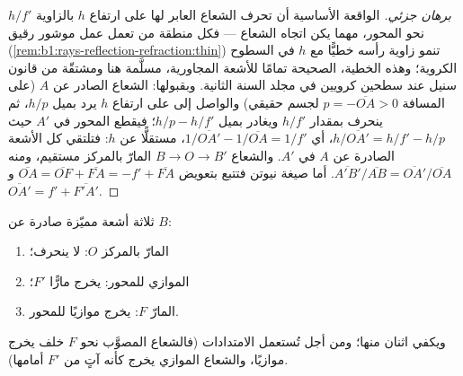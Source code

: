 \begin{proof}[برهان جزئي]
الواقعة الأساسية أن  تحرف الشعاع العابر لها على ارتفاع
$h$ بالزاوية $h/f'$ نحو المحور، مهما يكن اتجاه الشعاع
--- فكل منطقة من  تعمل عمل موشور رقيق (\cref{rem:b1:rays-reflection-refraction:thin})
تنمو زاوية رأسه خطيًّا مع $h$ في السطوح الكروية؛ وهذه
الخطية، الصحيحة تمامًا للأشعة المجاورية، مسلَّمة هنا ومشتقّة من قانون
سنيل عند سطحين كرويين في مجلد السنة الثانية. وبقبولها:
الشعاع الصادر عن $A$ (على المسافة $p = -\overline{OA} > 0$ لجسم
حقيقي) والواصل إلى  على ارتفاع $h$ يرد بميل $h/p$، ثم
ينحرف بمقدار $h/f'$ ويغادر بميل $h/p - h/f'$؛ فيقطع المحور
في $A'$ حيث $h/\overline{OA'} = h/f' - h/p$، أي $1/\overline{OA'}
- 1/\overline{OA} = 1/f'$، مستقلًّا عن $h$: فتلتقي كل الأشعة الصادرة عن $A$
في $A'$. والشعاع $B \to O \to B'$ المارّ بالمركز مستقيم، ومنه
$\overline{A'B'}/\overline{AB} = \overline{OA'}/\overline{OA}$. أما
صيغة نيوتن فتتبع بتعويض $\overline{OA} = \overline{OF} + \overline{FA}
= -f' + \overline{FA}$ و $\overline{OA'} = f' + \overline{F'A'}$.
\end{proof}

\begin{method}\label{met:b1:mirrors-thin-lenses:lensrays}
ثلاثة أشعة مميّزة صادرة عن $B$:
\begin{enumerate}
  \item المارّ بالمركز $O$: لا ينحرف؛
  \item الموازي للمحور: يخرج مارًّا  $F'$؛
  \item المارّ  $F$: يخرج موازيًا للمحور.
\end{enumerate}
ويكفي اثنان منها؛ ومن أجل  تُستعمل الامتدادات (فالشعاع
المصوَّب نحو $F$ خلف  يخرج موازيًا، والشعاع الموازي يخرج كأنه
آتٍ من $F'$ أمامها).
\end{method}

